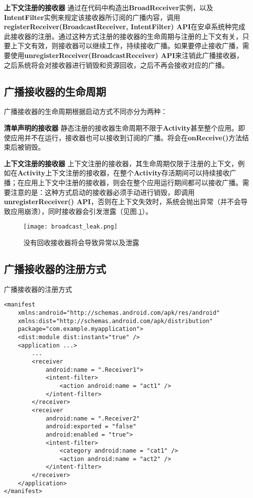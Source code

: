 \textbf{上下文注册的接收器 }\label{declaration:receiver in context} 通过在代码中构造出\textbf{BroadReceiver}实例，以及\textbf{IntentFilter}实例来规定该接收器所订阅的广播内容，调用\textbf{registerReceiver(BroadcastReceiver, IntentFilter) API}在安卓系统种完成此接收器的注册。通过这种方式注册的接收器的生命周期与注册的上下文有关，只要上下文有效，则接收器可以继续工作，持续接收广播。如果要停止接收广播，需要使用\textbf{unregisterReceiver(BroadcastReceiver) API}来注销此广播接收器，之后系统将会对接收器进行销毁和资源回收，之后不再会接收对应的广播。

\subsection{广播接收器的生命周期}

广播接收器的生命周期根据启动方式不同亦分为两种\cite{broadcast}：

\textbf{清单声明的接收器 } 静态注册的接收器生命周期不限于\textbf{Activity}甚至整个应用。即使应用并不在运行，接收器也可以接收到订阅的广播。将会在\textbf{onReceive()}方法结束后被销毁。


\textbf{上下文注册的接收器 } 上下文注册的接收器，其生命周期仅限于注册的上下文，例如在\textbf{Activity}上下文注册的接收器，在整个\textbf{Activity}存活期间可以持续接收广播；在应用上下文中注册的接收器，则会在整个应用运行期间都可以接收广播。需要注意的是：这种方式启动的接收器必须手动进行销毁，即调用\textbf{unregisterReceiver() API}，否则在上下文失效时，系统会抛出异常（并不会导致应用崩溃），同时接收器会引发泄露（见图.\textcolor{red}{\ref{fig:broadcast_leak}}）。

\begin{figure}[htbp]
	\centering
	\texttt{[image: broadcast\_leak.png]} %
	\caption{没有回收接收器将会导致异常以及泄露}
	\label{fig:broadcast_leak}
\end{figure}

\subsection{广播接收器的注册方式}
\begin{listing}[htbp]
	\centering
	\caption{广播接收器的注册方式}
	\begin{verbatim}
<manifest 
	xmlns:android="http://schemas.android.com/apk/res/android"
	xmlns:dist="http://schemas.android.com/apk/distribution"
	package="com.example.myapplication">
	<dist:module dist:instant="true" />
	<application ...>
		...
		<receiver
			android:name = ".Receiver1">
			<intent-filter>
				<action android:name = "act1" />
			</intent-filter>
		</receiver>
		<receiver
			android:name = ".Receiver2"
			android:exported = "false"
			android:enabled = "true">
			<intent-filter>
				<category android:name = "cat1" />
				<action android:name = "act2" />
			</intent-filter>
		</receiver>
	</application>
</manifest>
	\end{verbatim}
	\label{declaration:receiver}
\end{listing}

